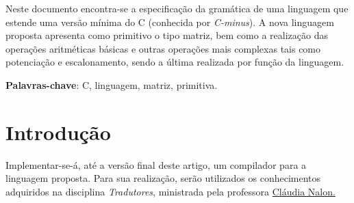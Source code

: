 \documentclass[
	article,			%
	11pt,				%
	oneside,			%
	a4paper,			%
	english,			%
	brazil,				%
	sumario=tradicional
	]{abntex2}
\begin{document}

\frenchspacing 


%
%

\maketitle





\begin{resumoumacoluna}
 Neste documento encontra-se a especificação da gramática de uma linguagem que estende uma versão mínima do C (conhecida por \textit{C-minus}). A nova linguagem proposta apresenta como primitivo o tipo matriz, bem como a realização das operações aritméticas básicas e outras operações mais complexas tais como potenciação e escalonamento, sendo a última realizada por função da linguagem.
 \vspace{\onelineskip}
 
 \noindent
 \textbf{Palavras-chave}: C, linguagem, matriz, primitiva.
\end{resumoumacoluna}




\newcommand{\terminal}[1]{ \bnfpn{\textbf{#1}} }

\newcommand{\production}[1]{\bnfpn{\textit{#1}}}
\newcommand{\IT}[1]{\textit{#1}}


\section{Introdução}
Implementar-se-á, até a versão final deste artigo, um compilador para a linguagem proposta. Para sua realização, serão utilizados os conhecimentos adquiridos na disciplina \textit{Tradutores}, ministrada pela professora \hyperref{http://lattes.cnpq.br/7793795625581127}{}{}{Cláudia Nalon.}
\end{document}
